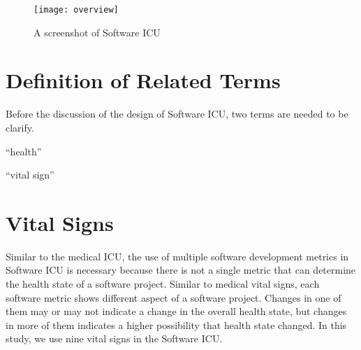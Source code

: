 \begin{figure}[htbp]
   \centering
   \texttt{[image: overview]}
   \caption{A screenshot of Software ICU}
   \label{fig:overview}
\end{figure}

\section {Definition of Related Terms}
Before the discussion of the design of Software ICU, two terms are needed to be clarify. 

``health''

``vital sign''

\section{Vital Signs}
\label{vitalSign}

Similar to the medical ICU, the use of multiple software development metrics in Software ICU is necessary because there is not a single metric that can determine the health state of a software project. Similar to medical vital signs, each software metric shows different aspect of a software project. Changes in one of them may or may not indicate a change in the overall health state, but changes in more of them indicates a higher possibility that health state changed. In this study, we use nine vital signs in the Software ICU.

